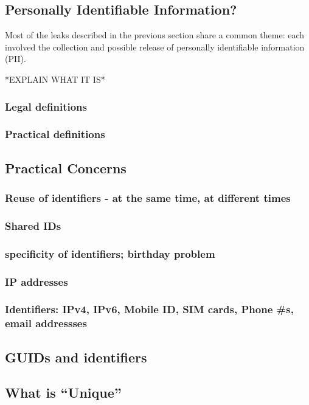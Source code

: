 \subsection{Personally Identifiable Information?}
Most of the leaks described in the previous section share a common
theme: each involved the collection and possible release of personally
identifiable information (PII).

*EXPLAIN WHAT IT IS*

\subsubsection{Legal definitions}

\subsubsection{Practical definitions}

\subsection{Practical Concerns}
\subsubsection{Reuse of identifiers - at the same time, at different times}
\subsubsection{Shared IDs}
\subsubsection{specificity of identifiers; birthday problem}
\subsubsection{IP addresses}
\subsubsection{Identifiers: IPv4, IPv6, Mobile ID, SIM cards, Phone \#s, email addressses}
\subsection{GUIDs and identifiers}
\subsection{What is ``Unique''}

